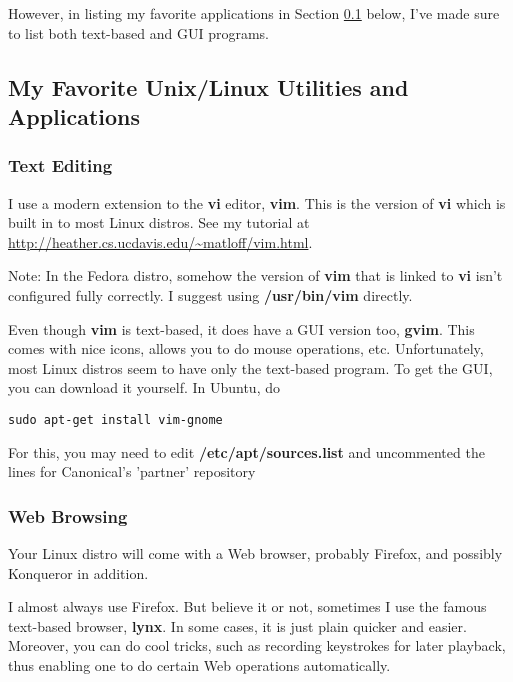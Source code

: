 \documentclass[11pt]{article}
\begin{document}
However, in listing my favorite applications in Section \ref{favorites}
below, I've made sure to list both text-based and GUI programs.

\subsection{My Favorite Unix/Linux Utilities and Applications} 
\label{favorites}

\subsubsection{Text Editing}

I use a modern extension to the {\bf vi} editor, {\bf vim}.  This is
the version of {\bf vi} which is built in to most Linux distros.  See my
tutorial at \url{http://heather.cs.ucdavis.edu/~matloff/vim.html}.   

Note:  In the Fedora distro, somehow the version of {\bf vim} that is
linked to {\bf vi} isn't configured fully correctly.  I suggest using
{\bf /usr/bin/vim} directly.

Even though {\bf vim} is text-based, it does have a GUI version too,
{\bf gvim}.  This comes with nice icons, allows you to do mouse
operations, etc.  Unfortunately, most Linux distros seem to have only
the text-based program.  To get the GUI, you can download it yourself.
In Ubuntu, do

\begin{Verbatim}[fontsize=\relsize{-2}]
sudo apt-get install vim-gnome
\end{Verbatim}

For this, you may need to edit {\bf /etc/apt/sources.list} and
uncommented the lines for Canonical's 'partner' repository

\subsubsection{Web Browsing}
\label{yessometimesiuselynx}

Your Linux distro will come with a Web browser, probably Firefox, and
possibly Konqueror in addition.

I almost always use Firefox.  But believe it or not, sometimes I use the
famous text-based browser, {\bf lynx}.  In some cases, it is just plain
quicker and easier.  Moreover, you can do cool tricks, such as recording
keystrokes for later playback, thus enabling one to do certain Web
operations automatically.
\end{document}
